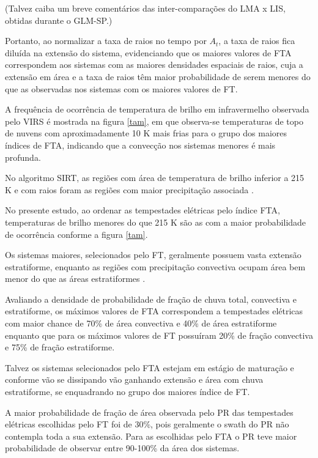 \documentclass[preprint,authoryear,3p]{elsarticle}
\begin{document}
\begin{multicols}{2}
(Talvez caiba um breve comentários das inter-comparações do LMA x LIS, obtidas durante o GLM-SP.)

Portanto, ao normalizar a taxa de raios no tempo por $A_t$, a taxa de raios fica diluída na extensão do sistema, evidenciando que os maiores valores de FTA correspondem aos sistemas com as maiores densidades espaciais de raios, cuja a extensão em área e a taxa de raios têm maior probabilidade de serem menores do que as observadas nos sistemas com os maiores valores de FT.

A frequência de ocorrência de temperatura de brilho em infravermelho observada pelo VIRS é mostrada na figura \ref{tam}, em que observa-se temperaturas de topo de nuvens com aproximadamente 10 K mais frias para o grupo dos maiores índices de FTA, indicando que a convecção nos sistemas menores é mais profunda. 

No algoritmo SIRT, as regiões com área de temperatura de brilho inferior a 215 K e com raios foram as regiões com maior precipitação associada \citep{morales2003}.

No presente estudo, ao ordenar as tempestades elétricas pelo índice FTA, temperaturas de brilho menores do que 215 K são as com a maior probabilidade de ocorrência conforme a figura \ref{tam}.

Os sistemas maiores, selecionados pelo FT, geralmente possuem vasta extensão estratiforme, enquanto as regiões com precipitação convectiva ocupam área bem menor do que as áreas estratiformes \citep{Jr2007, Rasmussen2011}.

Avaliando a densidade de probabilidade de fração de chuva total, convectiva e estratiforme, os máximos valores de FTA correspondem a tempestades elétricas com maior chance de 70\% de área convectiva e 40\% de área estratiforme enquanto que para os máximos valores de FT possuíram 20\% de fração convectiva e 75\% de fração estratiforme.

 

Talvez os sistemas selecionados pelo FTA estejam em estágio de maturação e conforme vão se dissipando vão ganhando extensão e área com chuva estratiforme, se enquadrando no grupo dos maiores índice de FT. 



A maior probabilidade de fração de área observada pelo PR das tempestades elétricas escolhidas pelo FT foi de 30\%, pois geralmente o swath do PR não contempla toda a sua extensão. Para as escolhidas pelo FTA o PR teve maior probabilidade de observar entre 90-100\% da área dos sistemas.


\end{multicols}
\end{document}
